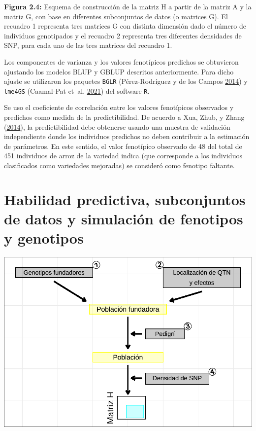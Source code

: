\documentclass[11pt,spanish,a4paper,oneside,]{book} %
\begin{document}
\begin{center}
\textbf{Figura 2.4:} Esquema de construcción de la matriz H a partir de la matriz A y la matriz G, con base en diferentes subconjuntos de datos (o matrices G). El recuadro 1 representa tres matrices G con distinta dimensión dado el número de individuos genotipados y el recuadro 2 representa tres diferentes densidades de SNP, para cada uno de las tres matrices del recuadro 1.

\end{center}

Los componentes de varianza y los valores fenotípicos predichos se obtuvieron ajustando los modelos BLUP y GBLUP descritos anteriormente. Para dicho ajuste se utilizaron los paquetes \texttt{BGLR} (Pérez-Rodríguez y de los Campos \protect\hyperlink{ref-cite:50}{2014}) y \texttt{lme4GS} (Caamal-Pat et~al. \protect\hyperlink{ref-cite:51}{2021}) del software \texttt{R}.

Se uso el coeficiente de correlación entre los valores fenotípicos observados y predichos como medida de la predictibilidad. De acuerdo a Xua, Zhub, y Zhang (\protect\hyperlink{ref-cite:25}{2014}), la predictibilidad debe obtenerse usando una muestra de validación independiente donde los individuos predichos no deben contribuir a la estimación de parámetros. En este sentido, el valor fenotípico observado de 48 del total de 451 individuos de arroz de la variedad indica (que corresponde a los individuos clasificados como variedades mejoradas) se consideró como fenotipo faltante.

\hypertarget{habilidad-predictiva-subconjuntos-de-datos-y-simulaciuxf3n-de-fenotipos-y-genotipos}{%
\section{Habilidad predictiva, subconjuntos de datos y simulación de fenotipos y genotipos}\label{habilidad-predictiva-subconjuntos-de-datos-y-simulaciuxf3n-de-fenotipos-y-genotipos}}

\begin{center}\includegraphics[width=1\linewidth]{figures/Esquema_2} \end{center}
\end{document}
